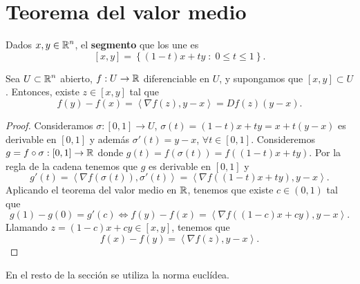 \section{Teorema del valor medio}
\begin{definition}[Segmento]
Dados $\displaystyle x,y \in \mathbb{R}^{n} $, el \textbf{segmento} que los une es
\[\left[x,y\right]  = \left\{ \left(1-t\right)x + ty \; : \; 0 \leq t \leq 1\right\}  .\]
\end{definition}
\begin{theorem}
	Sea $\displaystyle U \subset \mathbb{R}^{n} $ abierto, $\displaystyle f : U \to \mathbb{R} $ diferenciable en $\displaystyle U $, y supongamos que $\displaystyle \left[x,y\right]  \subset U $. Entonces, existe $\displaystyle z \in \left[x,y\right]  $ tal que 
	\[f\left(y\right)-f\left(x\right) = \left\langle \nabla f\left(z\right), y - x \right\rangle = Df\left(z\right) \left(y-x\right) .\]
\end{theorem}
\begin{proof}
	Consideramos $\displaystyle \sigma : \left[0,1\right] \to U $, $\displaystyle \sigma\left(t\right) = \left(1-t\right)x +ty = x + t\left(y - x\right)$ es derivable en $\displaystyle \left[0,1\right]  $ y además $\displaystyle \sigma'\left(t\right) = y - x $, $\displaystyle \forall t \in [0,1] $. Consideremos $\displaystyle g = f \circ \sigma : \left[0,1\right] \to \mathbb{R} $ donde $\displaystyle g\left(t\right)=f\left(\sigma\left(t\right)\right) = f\left(\left(1-t\right)x + ty\right) $. Por la regla de la cadena tenemos que $\displaystyle g $ es derivable en $\displaystyle [0,1] $ y
	\[g'\left(t\right)=\left\langle \nabla f\left(\sigma\left(t\right)\right), \sigma'\left(t\right) \right\rangle = \left\langle \nabla f\left(\left(1-t\right)x + ty\right), y-x \right\rangle  .\]
Aplicando el teorema del valor medio en $\displaystyle \mathbb{R} $, tenemos que existe $\displaystyle c \in \left(0,1\right) $ tal que 
\[g\left(1\right) -g\left(0\right) = g'\left(c\right) \iff f\left(y\right)-f\left(x\right) = \left\langle \nabla f\left(\left(1-c\right)x + cy\right), y-x \right\rangle  .\]
Llamando $\displaystyle z = \left(1-c\right)x + cy \in \left[x,y\right]  $, tenemos que 
\[f\left(x\right)-f\left(y\right) = \left\langle \nabla f\left(z\right), y - x \right\rangle  .\]
\end{proof}
\begin{observation}
En el resto de la sección se utiliza la norma euclídea.
\end{observation}

